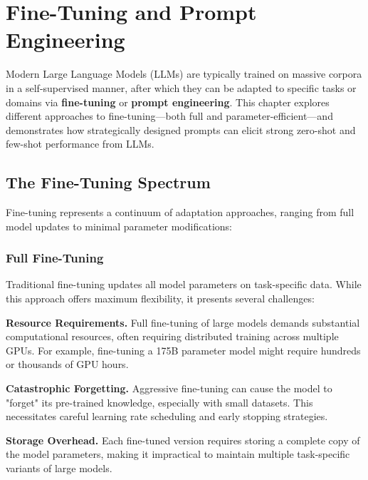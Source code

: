 \chapter{Fine-Tuning and Prompt Engineering}
\label{chap:fine_tuning_prompt}

\noindent
Modern Large Language Models (LLMs) are typically trained on massive corpora in a self-supervised manner, after which they can be adapted to specific tasks or domains via \textbf{fine-tuning} or \textbf{prompt engineering}. This chapter explores different approaches to fine-tuning—both full and parameter-efficient—and demonstrates how strategically designed prompts can elicit strong zero-shot and few-shot performance from LLMs.

\section{The Fine-Tuning Spectrum}
\noindent
Fine-tuning represents a continuum of adaptation approaches, ranging from full model updates to minimal parameter modifications:

\subsection{Full Fine-Tuning}
\noindent
Traditional fine-tuning updates all model parameters on task-specific data. While this approach offers maximum flexibility, it presents several challenges:

\textbf{Resource Requirements.} Full fine-tuning of large models demands substantial computational resources, often requiring distributed training across multiple GPUs. For example, fine-tuning a 175B parameter model might require hundreds or thousands of GPU hours.

\textbf{Catastrophic Forgetting.} Aggressive fine-tuning can cause the model to "forget" its pre-trained knowledge, especially with small datasets. This necessitates careful learning rate scheduling and early stopping strategies.

\textbf{Storage Overhead.} Each fine-tuned version requires storing a complete copy of the model parameters, making it impractical to maintain multiple task-specific variants of large models.

